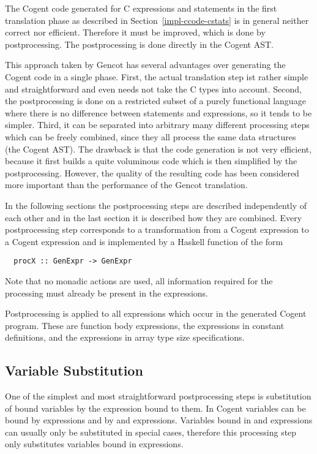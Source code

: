 The Cogent code generated for C expressions and statements in the first translation phase as described in 
Section~\ref{impl-ccode-cstats} is in general neither correct nor efficient. Therefore it must be improved, 
which is done by postprocessing. The postprocessing is done directly in the Cogent AST. 

This approach taken by Gencot has several advantages over generating the Cogent code in a single phase.
First, the actual translation step ist rather simple and straightforward and even needs not take the C types
into account. Second, the postprocessing is done on a restricted subset of a purely functional language where 
there is no difference between statements and expressions, so it tends to be simpler. Third, it can be separated
into arbitrary many different processing steps which can be freely combined, since they all process the same
data structures (the Cogent AST). The drawback is that the code generation is not very efficient, because it
first builds a quite voluminous code which is then simplified by the postprocessing. However, the quality 
of the resulting code has been considered more important than the performance of the Gencot translation.

In the following sections the postprocessing steps are described independently of each other and in the last
section it is described how they are combined. Every postprocessing step corresponds to a transformation from
a Cogent expression to a Cogent expression and is implemented by a Haskell function of the form
\begin{verbatim}
  procX :: GenExpr -> GenExpr
\end{verbatim}
Note that no monadic actions are used, all information required for the processing must already be present in the 
expressions.

Postprocessing is applied to all expressions which occur in the generated Cogent program. These are function 
body expressions, the expressions in constant definitions, and the expressions in array type size specifications.

\subsection{Variable Substitution}
\label{imp-post-vsubst}

One of the simplest and most straightforward postprocessing steps is substitution of bound variables by the
expression bound to them. In Cogent variables can be bound by  expressions and by  and 
expressions. Variables bound in  and  expressions can usually only be substituted in special cases, 
therefore this processing step only substitutes variables bound in  expressions. 


